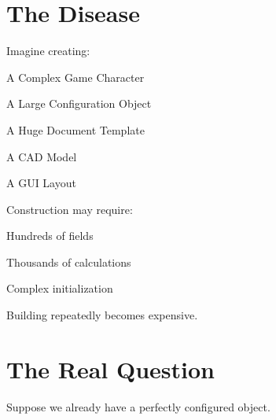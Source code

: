 \documentclass[11pt,a4paper]{book}
\begin{document}
\section{The Disease}

Imagine creating:


A Complex Game Character


A Large Configuration Object


A Huge Document Template


A CAD Model


A GUI Layout


Construction may require:


Hundreds of fields


Thousands of calculations


Complex initialization


Building repeatedly becomes
expensive.


\section{The Real Question}

Suppose we already have
a perfectly configured object.

\end{document}
